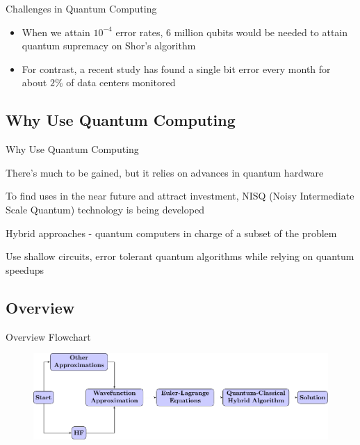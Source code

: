 \documentclass[professionalfonts]{beamer}
\newcommand{\SubItem}[1]{
    {\setlength\itemindent{15pt} \item[*] #1}
}
\begin{document}


\begin{frame}{Challenges in Quantum Computing}
	\begin{itemize}
		\item {When we attain $10^{-4}$ error rates, 6 million qubits would be needed to attain quantum supremacy on Shor's algorithm \citep{shor}}
		\item{For contrast, a recent study \citep{meza} has found a single bit error every month for about $2\%$ of data centers monitored}
	\end{itemize}
\end{frame}



\subsection{\textbf{Why Use Quantum Computing}}

\begin{frame}{Why Use Quantum Computing}
	\begin{itemize}
		\item There's much to be gained, but it relies on advances in quantum hardware
		\item To find uses in the near future and attract investment, NISQ (Noisy Intermediate Scale Quantum) technology is being developed
			\SubItem{Hybrid approaches - quantum computers in charge of a subset of the problem}
			\SubItem{Use shallow circuits, error tolerant quantum algorithms while relying on quantum speedups}
	\end{itemize}
\end{frame}



\subsection{\textbf{Overview}}

\begin{frame}{Overview Flowchart}
\begin{figure}[b]
	\centering
	\includegraphics[width=\textwidth]{../flowcharts/flowchart2}
\end{figure}
\end{frame}
\end{document}
